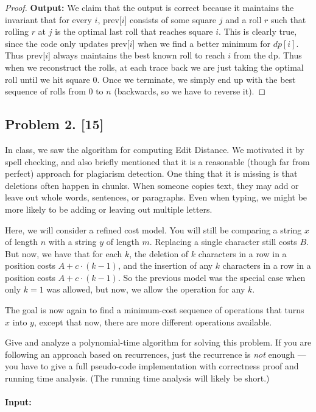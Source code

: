 \documentclass[10pt]{article}
\begin{document}
\begin{proof}
  \textbf{Output:} We claim that the output is correct because it maintains the invariant that for every \(i\), prev[\(i\)] consists of some square \(j\) and a roll \(r\) such that rolling \(r\) at \(j\) is the optimal last roll that reaches square \(i\). This is clearly true, since the code only updates prev[\(i\)] when we find a better minimum for \(dp[i]\). Thus prev[\(i\)] always maintains the best known roll to reach \(i\) from the dp. Thus when we reconstruct the rolls, at each trace back we are just taking the optimal roll until we hit square 0. Once we terminate, we simply end up with the best sequence of rolls from 0 to \(n\) (backwards, so we have to reverse it).
\end{proof}

\subsection*{Problem 2. [15]}
  In class, we saw the algorithm for computing Edit Distance.
  We motivated it by spell checking, and also briefly mentioned that it is a reasonable (though far from perfect) approach for plagiarism detection.
  One thing that it is missing is that deletions often happen in chunks. When someone copies text, they may add or leave out whole words, sentences, or paragraphs. Even when typing, we might be more likely to be adding or leaving out multiple letters.

  Here, we will consider a refined cost model. You will still be comparing a string $x$ of length $n$ with a string $y$ of length $m$. Replacing a single character still costs $B$. But now, we have that for each $k$, the deletion of $k$ characters in a row in a position costs $A + c \cdot (k-1)$, and the insertion of any $k$ characters in a row in a position costs $A + c \cdot (k-1)$. So the previous model was the special case when only $k=1$ was allowed, but now, we allow the operation for any $k$.

  The goal is now again to find a minimum-cost sequence of operations that turns $x$ into $y$, except that now, there are more different operations available.
  
  Give and analyze a polynomial-time algorithm for solving this problem. If you are following an approach based on recurrences, just the recurrence is \emph{not} enough --- you have to give a full pseudo-code implementation with correctness proof and running time analysis. (The running time analysis will likely be short.)

\paragraph*{Input:} 
\end{document}
